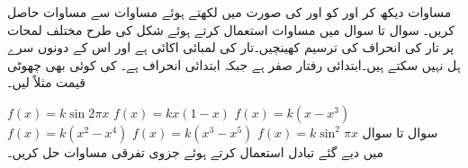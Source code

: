 
\quad
مساوات  دیکھ کر  اور  کو   اور  کی صورت  میں لکھتے ہوئے مساوات  سے  مساوات  حاصل کریں۔ 
سوال  تا سوال  میں مساوات  استعمال کرتے ہوئے شکل   کی طرح مختلف لمحات پر تار کی انحراف   کی  ترسیم کھینچیں۔تار کی لمبائی اکائی  ہے اور اس کے دونوں سرے ہل نہیں سکتے  ہیں۔ابتدائی رفتار صفر ہے جبکہ ابتدائی انحراف  ہے۔ کی کوئی بھی چھوٹی قیمت مثلاً  لیں۔

\quad
$f(x)=k\sin 2\pi x$
\quad
$f(x)=kx(1-x)$
\quad
$f(x)=k(x-x^3)$
\quad
$f(x)=k(x^2-x^4)$
\quad
$f(x)=k(x^3-x^5)$
\quad
$f(x)=k\sin^2 \pi x$
سوال  تا سوال  میں دیے گئے تبادل استعمال کرتے ہوئے جزوی تفرقی مساوات حل کریں۔ 

